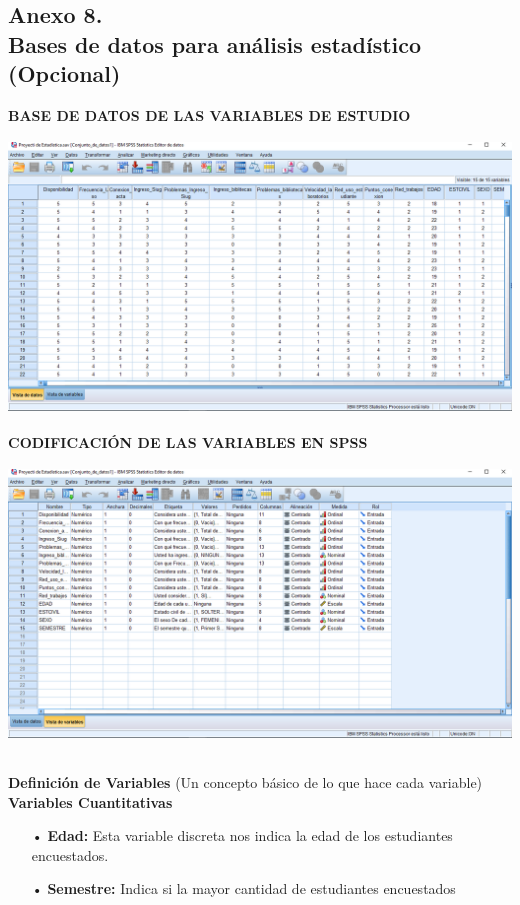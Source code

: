 \documentclass[12pt, a4paper, nofontenc, numbers=endperiod]{apa7}
\begin{document}
{\newpage
\subsection*{\normalsize \centering Anexo 8. \\ Bases de datos para análisis estadístico (Opcional)}
\vspace*{0.2cm}
\begin{center}
	\textbf{BASE DE DATOS DE LAS VARIABLES DE ESTUDIO}   \\
	\vspace*{1cm}
	\includegraphics[width=14cm,height=8cm]{Imagenes/Figura16} \\
	\vspace*{1cm}
	\textbf{CODIFICACIÓN DE LAS VARIABLES EN SPSS} \\
	\vspace*{1cm}
	\includegraphics[width=14cm,height=8cm]{Imagenes/Figura17}
	
\end{center}
\newpage
\textbf{Definición de Variables} (Un concepto básico de lo que hace cada variable)\\
\textbf{Variables Cuantitativas}
\begin{itemize}
	\item[•] \textbf{Edad:} Esta variable discreta nos indica la edad de los estudiantes encuestados.
	\item[•] \textbf{Semestre:} Indica si la mayor cantidad de estudiantes encuestados
	

\end{itemize}}
\end{document}
